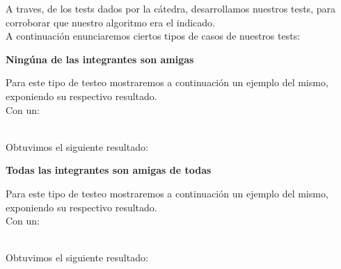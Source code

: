 \indent A traves, de los tests dados por la c\'atedra, desarrollamos nuestros tests,
para corroborar que nuestro algoritmo era el indicado.\\

A continuaci\'on enunciaremos ciertos tipos de casos de nuestros tests:\\

\begin{center}
 \textbf{Ning\'una de las integrantes son amigas}
\end{center}
 Para este tipo de testeo mostraremos a continuaci\'on un ejemplo del mismo, exponiendo su respectivo resultado.\\

 Con un:\\\\
  \indent  
  
  Obtuvimos el siguiente resultado:\\


\begin{center}
 \textbf{Todas las integrantes son amigas de todas}
\end{center}
 Para este tipo de testeo mostraremos a continuaci\'on un ejemplo del mismo, exponiendo su respectivo resultado.\\

 Con un:\\\\
  \indent  
  
  Obtuvimos el siguiente resultado:\\
 
